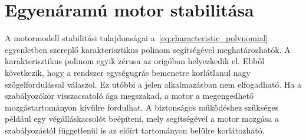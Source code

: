 \section{Egyenáramú motor stabilitása}
A motormodell stabilitási tulajdonságai a~\eqref{eq:characteristic_polynomial} egyenletben szereplő karakterisztikus 
polinom segítségével meghatározhatók.
A karakterisztikus polinom egyik zérusa az origóban helyezkedik el. Ebből következik, hogy a rendszer
egységugrás bemenetre korlátlanul nagy szögelfordulással válaszol. Ez utóbbi a jelen alkalmazásban nem elfogadható. 
Ha a szabályozókör visszacsatoló ága megszakad, a motor a megengedhető mozgástartományon kívülre fordulhat.
A biztonságos működéshez szükséges például egy végálláskacsolót beépíteni, mely segítségével a motor 
mozgása a szabályozástól függetlenül is az előírt tartományon belülre korlátozható.

